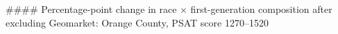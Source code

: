 #### Percentage-point change in race × first-generation composition after excluding Geomarket: Orange County, PSAT score 1270–1520
